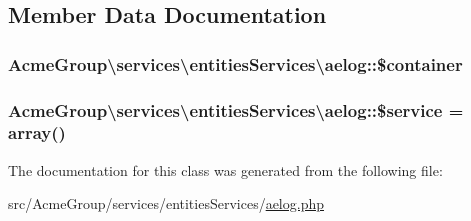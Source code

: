 \subsection{Member Data Documentation}
\hypertarget{class_acme_group_1_1services_1_1entities_services_1_1aelog_ac736b09862c07d107bdd2a3ccb8dfe21}{
\subsubsection[{\$container}]{\setlength{\rightskip}{0pt plus 5cm}Acme\+Group\textbackslash{}services\textbackslash{}entities\+Services\textbackslash{}aelog\+::\$container\hspace{0.3cm}{\ttfamily [protected]}}}\label{class_acme_group_1_1services_1_1entities_services_1_1aelog_ac736b09862c07d107bdd2a3ccb8dfe21}
\hypertarget{class_acme_group_1_1services_1_1entities_services_1_1aelog_aa8afbca8b071a89104b5a82955a3a448}{
\subsubsection[{\$service}]{\setlength{\rightskip}{0pt plus 5cm}Acme\+Group\textbackslash{}services\textbackslash{}entities\+Services\textbackslash{}aelog\+::\$service = array()\hspace{0.3cm}{\ttfamily [protected]}}}\label{class_acme_group_1_1services_1_1entities_services_1_1aelog_aa8afbca8b071a89104b5a82955a3a448}


The documentation for this class was generated from the following file\+:\begin{DoxyCompactItemize}
\item 
src/\+Acme\+Group/services/entities\+Services/\hyperlink{services_2entities_services_2aelog_8php}{aelog.\+php}\end{DoxyCompactItemize}
